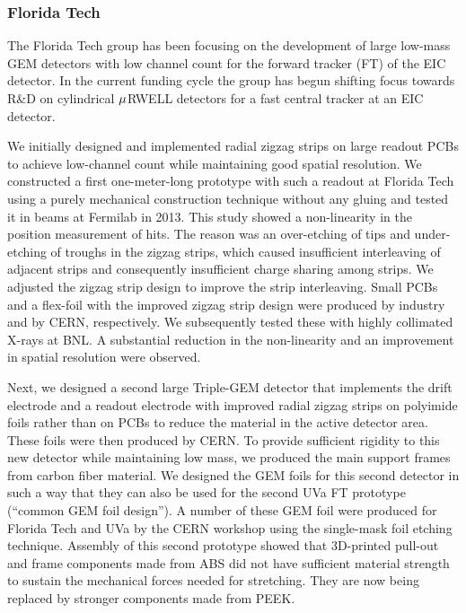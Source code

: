 \subsubsection{Florida Tech} 
The Florida Tech group has been focusing on the development of large low-mass GEM detectors with low channel count for the forward tracker (FT) of the EIC detector. In the current funding cycle the group has begun shifting focus towards R\&D on cylindrical $\boldmath{\mu}$RWELL detectors for a fast central tracker at an EIC detector.

We initially designed and implemented radial zigzag strips on large readout PCBs to achieve low-channel count while maintaining good spatial resolution. We constructed a first one-meter-long prototype with such a readout at Florida Tech using a purely mechanical construction technique without any gluing and tested it in beams at Fermilab in 2013. This study showed a non-linearity in the position measurement of hits\cite{Zhang:2015pqa}. The reason was an over-etching of tips and under-etching of troughs in the zigzag strips, which caused insufficient interleaving of adjacent strips and consequently insufficient charge sharing among strips. We adjusted the zigzag strip design to improve the strip interleaving. Small PCBs and a flex-foil with the improved zigzag strip design were produced by industry and by CERN, respectively. We subsequently tested these with highly collimated X-rays at BNL. A substantial reduction in the non-linearity and an improvement in spatial resolution were observed\cite{Zhang:2017dqw}.

Next, we designed a second large Triple-GEM detector that implements the drift electrode and a readout electrode with improved radial zigzag strips on polyimide foils rather than on PCBs to reduce the material in the active detector area\cite{Hohlmann:2017sqj}. These foils were then produced by CERN. To provide sufficient rigidity to this new detector while maintaining low mass, we produced the main support frames from carbon fiber material. We designed the GEM foils for this second detector in such a way that they can also be used for the second UVa FT prototype (``common GEM foil design''). A number of these GEM foil were produced for Florida Tech and UVa by the CERN workshop using the single-mask foil etching technique. Assembly of this second prototype showed that 3D-printed pull-out and frame components made from ABS did not have sufficient material strength to sustain the mechanical forces needed for stretching. They are now being replaced by stronger components made from PEEK.